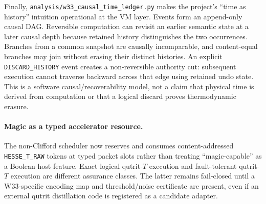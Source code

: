 Finally, \texttt{analysis/w33\_causal\_time\_ledger.py} makes the project's
``time as history'' intuition operational at the VM layer.  Events form an
append-only causal DAG.  Reversible computation can revisit an earlier semantic
state at a later causal depth because retained history distinguishes the two
occurrences.  Branches from a common snapshot are causally incomparable, and
content-equal branches may join without erasing their distinct histories.  An
explicit \texttt{DISCARD\_HISTORY} event creates a non-reversible authority cut:
subsequent execution cannot traverse backward across that edge using retained
undo state.  This is a software causal/recoverability model, not a claim that
physical time is derived from computation or that a logical discard proves
thermodynamic erasure.

\paragraph{Magic as a typed accelerator resource.}
The non-Clifford scheduler now reserves and consumes content-addressed
\texttt{HESSE\_T\_RAW} tokens at typed packet slots rather than treating
``magic-capable'' as a Boolean host feature.  Exact logical qutrit-$T$ execution
and fault-tolerant qutrit-$T$ execution are different assurance classes.  The
latter remains fail-closed until a W33-specific encoding map and threshold/noise
certificate are present, even if an external qutrit distillation code is
registered as a candidate adapter.

